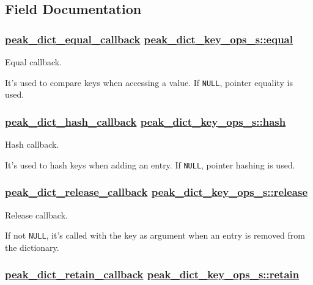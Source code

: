 \subsection{Field Documentation}
\hypertarget{structpeak__dict__key__ops__s_o2}{
\subsubsection[equal]{\setlength{\rightskip}{0pt plus 5cm}\hyperlink{group__dict_ga3}{peak\_\-dict\_\-equal\_\-callback} \hyperlink{structpeak__dict__key__ops__s_o2}{peak\_\-dict\_\-key\_\-ops\_\-s::equal}}}
\label{structpeak__dict__key__ops__s_o2}


Equal callback. 

It's used to compare keys when accessing a value. If {\tt NULL}, pointer equality is used. \hypertarget{structpeak__dict__key__ops__s_o3}{
\subsubsection[hash]{\setlength{\rightskip}{0pt plus 5cm}\hyperlink{group__dict_ga4}{peak\_\-dict\_\-hash\_\-callback} \hyperlink{structpeak__dict__key__ops__s_o3}{peak\_\-dict\_\-key\_\-ops\_\-s::hash}}}
\label{structpeak__dict__key__ops__s_o3}


Hash callback. 

It's used to hash keys when adding an entry. If {\tt NULL}, pointer hashing is used. \hypertarget{structpeak__dict__key__ops__s_o1}{
\subsubsection[release]{\setlength{\rightskip}{0pt plus 5cm}\hyperlink{group__dict_ga2}{peak\_\-dict\_\-release\_\-callback} \hyperlink{structpeak__dict__key__ops__s_o1}{peak\_\-dict\_\-key\_\-ops\_\-s::release}}}
\label{structpeak__dict__key__ops__s_o1}


Release callback. 

If not {\tt NULL}, it's called with the key as argument when an entry is removed from the dictionary. \hypertarget{structpeak__dict__key__ops__s_o0}{
\subsubsection[retain]{\setlength{\rightskip}{0pt plus 5cm}\hyperlink{group__dict_ga1}{peak\_\-dict\_\-retain\_\-callback} \hyperlink{structpeak__dict__key__ops__s_o0}{peak\_\-dict\_\-key\_\-ops\_\-s::retain}}}
\label{structpeak__dict__key__ops__s_o0}


